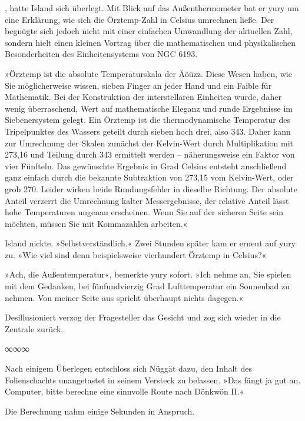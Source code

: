 , hatte Island sich überlegt. Mit Blick auf das Außenthermometer bat er yury um eine Erklärung, wie sich die Örztemp-Zahl in Celsius umrechnen ließe. Der begnügte sich jedoch nicht mit einer einfachen Umwandlung der aktuellen Zahl, sondern hielt einen kleinen Vortrag über die mathematischen und physikalischen Besonderheiten des Einheitensystems von NGC 6193.

»Örztemp ist die absolute Temperaturskala der Äöüzz. Diese Wesen haben, wie Sie möglicherweise wissen, sieben Finger an jeder Hand und ein Faible für Mathematik. Bei der Konstruktion der interstellaren Einheiten wurde, daher wenig überraschend, Wert auf mathematische Eleganz und runde Ergebnisse im Siebenersystem gelegt. Ein Örztemp ist die thermodynamische Temperatur des Tripelpunktes des Wassers geteilt durch sieben hoch drei, also 343. Daher kann zur Umrechnung der Skalen zunächst der Kelvin-Wert durch Multiplikation mit 273,16 und Teilung durch 343 ermittelt werden – näherungsweise ein Faktor von vier Fünfteln. Das gewünschte Ergebnis in Grad Celsius entsteht anschließend ganz einfach durch die bekannte Subtraktion von 273,15 vom Kelvin-Wert, oder grob 270. Leider wirken beide Rundungsfehler in dieselbe Richtung. Der absolute Anteil verzerrt die Umrechnung kalter Messergebnisse, der relative Anteil lässt hohe Temperaturen ungenau erscheinen. Wenn Sie auf der sicheren Seite sein möchten, müssen Sie mit Kommazahlen arbeiten.«

Island nickte. »Selbstverständlich.« Zwei Stunden später kam er erneut auf yury zu. »Wie viel sind denn beispielsweise vierhundert Örztemp in Celsius?«

»Ach, die Außentemperatur«, bemerkte yury sofort. »Ich nehme an, Sie spielen mit dem Gedanken, bei fünfundvierzig Grad Lufttemperatur ein Sonnenbad zu nehmen. Von meiner Seite aus spricht überhaupt nichts dagegen.«

Desillusioniert verzog der Fragesteller das Gesicht und zog sich wieder in die Zentrale zurück.

\begin{center}
∞∞∞
\end{center}

Nach einigem Überlegen entschloss sich Nüggät dazu, den Inhalt des Folienschachts unangetastet in seinem Versteck zu belassen. »Das fängt ja gut an. Computer, bitte berechne eine sinnvolle Route nach Dönkwön II.«

Die Berechnung nahm einige Sekunden in Anspruch. 

